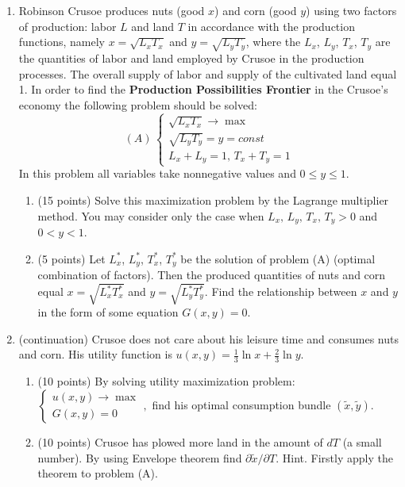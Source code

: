 \begin{enumerate}[resume]
\item Robinson Crusoe produces nuts (good $x$) and corn (good $y$) using two factors of production: labor $L$ and land $T$ in accordance with the production functions, namely $x=\sqrt{L_x T_x}$ and $y=\sqrt{L_y T_y}$, where the $L_x$, $L_y$, $T_x$, $T_y$ are the quantities of labor and land employed by Crusoe in the production processes. The overall supply of labor and supply of the cultivated land equal 1. In order to find the \textbf{Production Possibilities Frontier} in the Crusoe’s economy the following problem should be solved:
\[
(A)\,
\begin{cases}
	\sqrt{L_x T_x} \to \max \\
	\sqrt{L_y T_y}=y=const \\
	L_x + L_y = 1, \, T_x + T_y = 1
\end{cases}
\]
In this problem all variables take nonnegative values and $0\leq y\leq 1$.

\begin{enumerate}
\item (15 points) Solve this maximization problem by the Lagrange multiplier method. You may consider only the case when $L_x,\, L_y,\, T_x, \, T_y>0$  and $0<y<1$.
\item (5 points) Let $L_x^*$, $L_y^*$, $T_x^*$, $T_y^*$ be the solution of problem (A) (optimal combination of factors). Then the produced quantities of nuts and corn equal $x=\sqrt{L_x^* T_x^*}$ and $y=\sqrt{L_y^* T_y^*}$. Find the relationship between $x$ and $y$ in the form of some equation $G(x,y)=0$.
\end{enumerate}

\item (continuation) Crusoe does not care about his leisure time and consumes nuts and corn. His utility function is $u(x,y)=\frac{1}{3}\ln x + \frac{2}{3}\ln y$.

\begin{enumerate}
\item (10 points) By solving utility maximization problem:
$
\begin{cases}
u(x,y) \to \max \\
G(x,y)=0
\end{cases},
$ find his optimal consumption bundle $(\tilde{x},\tilde{y})$.
\item (10 points) Crusoe has plowed more land in the amount of $dT$ (a small number). By using Envelope theorem find $\partial \tilde{x}/\partial T$. Hint. Firstly apply the theorem to problem (A).
\end{enumerate}

\end{enumerate}

